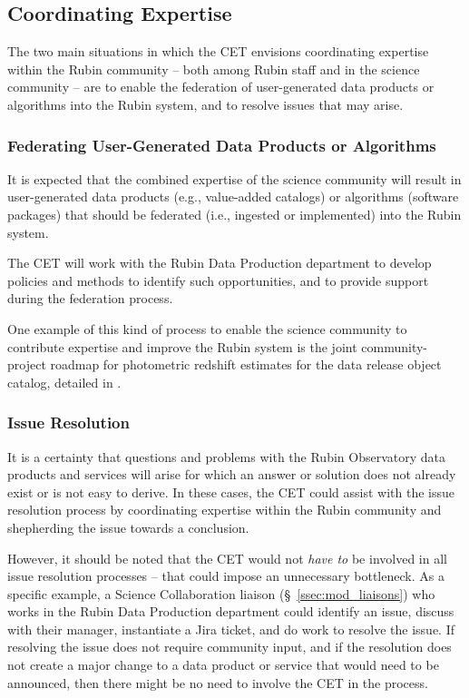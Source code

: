 \documentclass[DM,lsstdraft,toc]{lsstdoc}
\begin{document}
\subsection{Coordinating Expertise}\label{ssec:mod_coord}

The two main situations in which the CET envisions coordinating expertise within the Rubin community -- both among Rubin staff and in the science community -- are to enable the federation of user-generated data products or algorithms into the Rubin system, and to resolve issues that may arise.


\subsubsection{Federating User-Generated Data Products or Algorithms}\label{sssec:mod_coord_ug}

It is expected that the combined expertise of the science community will result in user-generated data products (e.g., value-added catalogs) or algorithms (software packages) that should be federated (i.e., ingested or implemented) into the Rubin system.

The CET will work with the Rubin Data Production department to develop policies and methods to identify such opportunities, and to provide support during the federation process.

One example of this kind of process to enable the science community to contribute expertise and improve the Rubin system is the joint community-project roadmap for photometric redshift estimates for the data release object catalog, detailed in .


\subsubsection{Issue Resolution}\label{sssec:mod_coord_res}

It is a certainty that questions and problems with the Rubin Observatory data products and services will arise for which an answer or solution does not already exist or is not easy to derive. 
In these cases, the CET could assist with the issue resolution process by coordinating expertise within the Rubin community and shepherding the issue towards a conclusion.

However, it should be noted that the CET would not \textit{have to} be involved in all issue resolution processes -- that could impose an unnecessary bottleneck.
As a specific example, a Science Collaboration liaison (\S~\ref{ssec:mod_liaisons}) who works in the Rubin Data Production department could identify an issue, discuss with their manager, instantiate a Jira ticket, and do work to resolve the issue.
If resolving the issue does not require community input, and if the resolution does not create a major change to a data product or service that would need to be announced, then there might be no need to involve the CET in the process.
\end{document}
